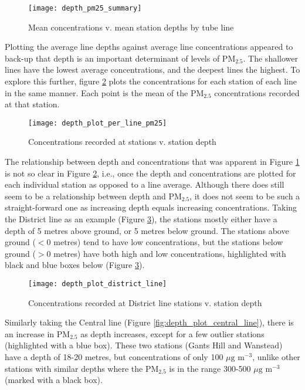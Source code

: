 \begin{figure}[H]
\centering
\texttt{[image: depth\_pm25\_summary]}
\caption{Mean concentrations v. mean station depths by tube line}
\label{fig:concentrations_depth_summary}
\end{figure}

Plotting the average line depths against average line concentrations appeared to back-up that depth is an important determinant of levels of PM$_{2.5}$. The shallower lines have the lowest average concentrations, and the deepest lines the highest. To explore this further, figure \ref{fig:depth_plot_per_line_pm25} plots the concentrations for each station of each line in the same manner. Each point is the mean of the PM$_{2.5}$ concentrations recorded at that station.

\begin{figure}[H]
\centering
\texttt{[image: depth\_plot\_per\_line\_pm25]}
\caption{Concentrations recorded at stations v. station depth}
\label{fig:depth_plot_per_line_pm25}
\end{figure}

The relationship between depth and concentrations that was apparent in Figure \ref{fig:concentrations_depth_summary} is not so clear in Figure \ref{fig:depth_plot_per_line_pm25}, i.e., once the depth and concentrations are plotted for each individual station as opposed to a line average. Although there does still seem to be a relationship between depth and PM$_{2.5}$, it does not seem to be such a straight-forward one as increasing depth equals increasing concentrations. Taking the District line as an example (Figure \ref{fig:depth_plot_district_line}), the stations mostly either have a depth of 5 metres above ground, or 5 metres below ground. The stations above ground ($<0$ metres) tend to have low concentrations, but the stations below ground ($>0$ metres) have both high and low concentrations, highlighted with black and blue boxes below (Figure \ref{fig:depth_plot_district_line}).

\begin{figure}[H]
\centering
\texttt{[image: depth\_plot\_district\_line]}
\caption{Concentrations recorded at District line stations v. station depth}
\label{fig:depth_plot_district_line}
\end{figure}

Similarly taking the Central line (Figure \ref{fig:depth_plot_central_line}), there is an increase in PM$_{2.5}$ as depth increases, except for a few outlier stations (highlighted with a blue box). These two stations (Gants Hill and Wanstead) have a depth of 18-20 metres, but concentrations of only 100 $\mu \text{g m}^{-3}$, unlike other stations with similar depths where the PM$_{2.5}$ is in the range 300-500 $\mu \text{g m}^{-3}$ (marked with a black box).

